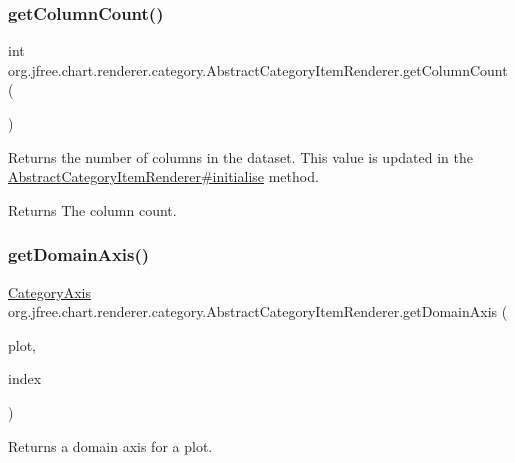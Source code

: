 \subsubsection{\texorpdfstring{get\+Column\+Count()}{getColumnCount()}}
{\footnotesize\ttfamily int org.\+jfree.\+chart.\+renderer.\+category.\+Abstract\+Category\+Item\+Renderer.\+get\+Column\+Count (\begin{DoxyParamCaption}{ }\end{DoxyParamCaption})}

Returns the number of columns in the dataset. This value is updated in the \mbox{\hyperlink{classorg_1_1jfree_1_1chart_1_1renderer_1_1category_1_1_abstract_category_item_renderer_a9cfe3bcab2e0572bf9e9c5ca38c63346}{Abstract\+Category\+Item\+Renderer\#initialise}} method.

\begin{DoxyReturn}{Returns}
The column count. 
\end{DoxyReturn}
\mbox{\label{classorg_1_1jfree_1_1chart_1_1renderer_1_1category_1_1_abstract_category_item_renderer_af9a5e3fcc2c090ca3702fba7eec846c6}} 
\subsubsection{\texorpdfstring{get\+Domain\+Axis()}{getDomainAxis()}}
{\footnotesize\ttfamily \mbox{\hyperlink{classorg_1_1jfree_1_1chart_1_1axis_1_1_category_axis}{Category\+Axis}} org.\+jfree.\+chart.\+renderer.\+category.\+Abstract\+Category\+Item\+Renderer.\+get\+Domain\+Axis (\begin{DoxyParamCaption}\item[{\mbox{\hyperlink{classorg_1_1jfree_1_1chart_1_1plot_1_1_category_plot}{Category\+Plot}}}]{plot,  }\item[{int}]{index }\end{DoxyParamCaption})\hspace{0.3cm}{\ttfamily [protected]}}

Returns a domain axis for a plot.


